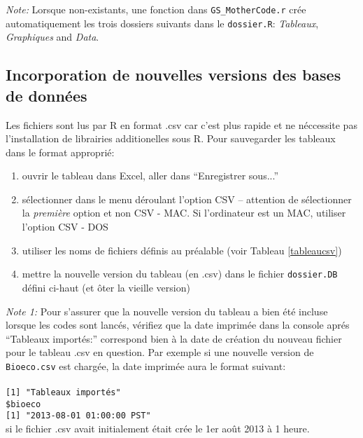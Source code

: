 \documentclass{article}
\begin{document}
\noindent \emph{Note:} Lorsque non-existants, une fonction dans \texttt{GS\_MotherCode.r} crée
automatiquement les trois dossiers
suivants dans le \texttt{dossier.R}: \emph{Tableaux},
\emph{Graphiques} and \emph{Data}. \\

\subsection{Incorporation de nouvelles versions des bases de données}
\label{nouvdb}
Les fichiers sont lus par R en format .csv car c'est plus rapide et
ne néccessite pas l'installation de librairies additionelles sous
R. Pour sauvegarder les tableaux dans le format approprié:
\begin{enumerate}
  \item ouvrir le tableau dans Excel, aller dans ``Enregistrer sous...''
  \item sélectionner dans le menu déroulant l'option CSV -- attention
    de sélectionner la \emph{première} option et non CSV - MAC. Si
    l'ordinateur est un MAC, utiliser l'option CSV - DOS
  \item utiliser les noms de fichiers définis au préalable (voir
    Tableau \ref{tableaucsv})
   \item mettre la nouvelle version du tableau (en .csv) dans le
    fichier \texttt{dossier.DB} défini ci-haut (et ôter la vieille
    version)

    \end{enumerate}
\emph{Note 1:} Pour s'assurer que la nouvelle version du tableau a bien
été incluse lorsque les codes sont lancés, vérifiez que la date
imprimée dans la console aprés ``Tableaux importés:'' correspond bien à la
date de création du nouveau fichier pour le tableau .csv en
question. Par exemple si une nouvelle version de \texttt{Bioeco.csv}
est chargée, la date imprimée aura le format suivant: \\
\\
\texttt{[1] "Tableaux importés"}\\
\texttt{\$bioeco} \\
\texttt{[1] "2013-08-01 01:00:00 PST"}\\
si le fichier .csv avait initialement était crée le 1er août 2013 à 1 heure.
\end{document}
